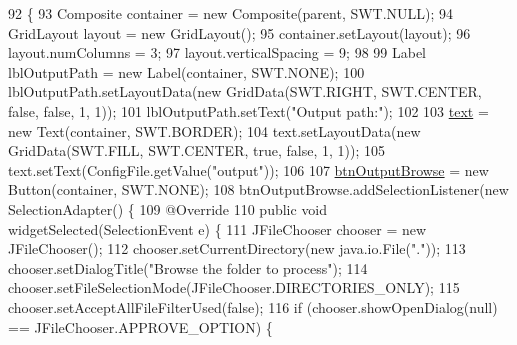 \begin{DoxyCode}
92                                                 \{
93         Composite container = \textcolor{keyword}{new} Composite(parent, SWT.NULL);
94         GridLayout layout = \textcolor{keyword}{new} GridLayout();
95         container.setLayout(layout);
96         layout.numColumns = 3;
97         layout.verticalSpacing = 9;
98         
99         Label lblOutputPath = \textcolor{keyword}{new} Label(container, SWT.NONE);
100         lblOutputPath.setLayoutData(\textcolor{keyword}{new} GridData(SWT.RIGHT, SWT.CENTER, \textcolor{keyword}{false}, \textcolor{keyword}{false}, 1, 1));
101         lblOutputPath.setText(\textcolor{stringliteral}{"Output path:"});
102         
103         \hyperlink{classit_1_1isislab_1_1masonhelperdocumentation_1_1mason_1_1wizards_1_1_b___project_information_page_ac62e1a690396a9296b72dda3e66d0a55}{text} = \textcolor{keyword}{new} Text(container, SWT.BORDER);
104         text.setLayoutData(\textcolor{keyword}{new} GridData(SWT.FILL, SWT.CENTER, \textcolor{keyword}{true}, \textcolor{keyword}{false}, 1, 1));
105         text.setText(ConfigFile.getValue(\textcolor{stringliteral}{"output"}));
106         
107         \hyperlink{classit_1_1isislab_1_1masonhelperdocumentation_1_1mason_1_1wizards_1_1_b___project_information_page_ab2605aae4ffe03c9e27ad871c1eab17f}{btnOutputBrowse} = \textcolor{keyword}{new} Button(container, SWT.NONE);
108         btnOutputBrowse.addSelectionListener(\textcolor{keyword}{new} SelectionAdapter() \{
109             @Override
110             \textcolor{keyword}{public} \textcolor{keywordtype}{void} widgetSelected(SelectionEvent e) \{
111                 JFileChooser chooser = \textcolor{keyword}{new} JFileChooser();
112                 chooser.setCurrentDirectory(\textcolor{keyword}{new} java.io.File(\textcolor{stringliteral}{"."}));
113                 chooser.setDialogTitle(\textcolor{stringliteral}{"Browse the folder to process"});
114                 chooser.setFileSelectionMode(JFileChooser.DIRECTORIES\_ONLY);
115                 chooser.setAcceptAllFileFilterUsed(\textcolor{keyword}{false});
116                 \textcolor{keywordflow}{if} (chooser.showOpenDialog(null) == JFileChooser.APPROVE\_OPTION) \{                         
           

\end{DoxyCode}
